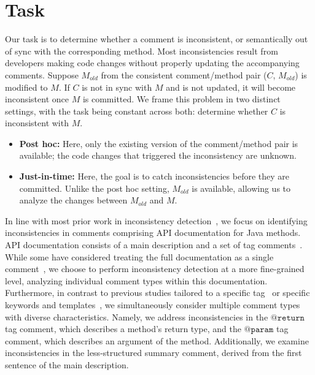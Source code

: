 \documentclass[letterpaper]{article} %
\makeatletter
\newcommand{\CodeIn}[1]{{\ifmmode{\mathtt{#1}}\else$\mathtt{#1}$\fi}}
\newcommand{\Return}{\CodeIn{@return}}
\newcommand{\Param}{\CodeIn{@param}}
\newcommand{\Comment}{$C$}
\newcommand{\OldCode}{$M_{old}$}
\newcommand{\NewCode}{$M$}
\newcommand{\Posthoc}{post hoc}
\makeatother
\begin{document}
\section{Task}

Our task is to determine whether a comment is inconsistent, or semantically out of sync with the corresponding method. Most inconsistencies result from developers making code changes without properly updating the accompanying comments. Suppose \OldCode{} from the consistent comment/method pair (\Comment{}, \OldCode{}) is modified to \NewCode{}. If \Comment{} is not in sync with \NewCode{} and is not updated, it will become inconsistent once \NewCode{} is committed. We frame this problem in two distinct settings, with the task being constant across both: determine whether \Comment{} is inconsistent with \NewCode{}.

\begin{itemize}
\item \textbf{Post hoc:} Here, only the existing version of the comment/method pair is available; the code changes that triggered the inconsistency are unknown.
\item \textbf{Just-in-time:} Here, the goal is to catch inconsistencies before they are committed. Unlike the \Posthoc{} setting, \OldCode{} is available, allowing us to analyze the changes between \OldCode{} and \NewCode{}.
\end{itemize}

In line with most prior work in inconsistency detection~\cite{Corazza18, icomment2007,tComment,Khamis2010AutomaticQA}, we focus on identifying inconsistencies in comments comprising API documentation for Java methods. API documentation consists of a main description and a set of tag comments~\cite{javadoc}. While some have considered treating the full documentation as a single comment~\cite{Corazza18}, we choose to perform inconsistency detection at a more fine-grained level, analyzing individual comment types within this documentation. Furthermore, in contrast to previous studies tailored to a specific tag~\cite{ZhouParameter, tComment} or specific keywords and templates~\cite{icomment2007,aComment}, we simultaneously consider multiple comment types with diverse characteristics. Namely, we address inconsistencies in the \Return{} tag comment, which describes a method's return type, and the \Param{} tag comment, which describes an argument of the method. Additionally, we examine inconsistencies in the less-structured summary comment, derived from the first sentence of the main description.
\end{document}
